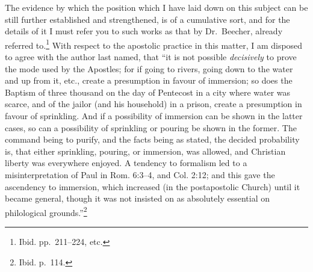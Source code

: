 \documentclass[
  english,
]{book}
\begin{document}
The evidence by which the position which I have laid down on this subject can be still further established and strengthened, is of a cumulative sort, and for the details of it I must refer you to such works as that by Dr.~Beecher, already referred to.\footnote{Ibid. pp.~211--224, etc.} With respect to the apostolic practice in this matter, I am disposed to agree with the author last named, that ``it is not possible \emph{decisively} to prove the mode used by the Apostles; for if going to rivers, going down to the water and up from it, etc., create a presumption in favour of immersion; so does the Baptism of three thousand on the day of Pentecost in a city where water was scarce, and of the jailor (and his household) in a prison, create a presumption in favour of sprinkling. And if a possibility of immersion can be shown in the latter cases, so can a possibility of sprinkling or pouring be shown in the former. The command being to purify, and the facts being as stated, the decided probability is, that either sprinkling, pouring, or immersion, was allowed, and Christian liberty was everywhere enjoyed. A tendency to formalism led to a misinterpretation of Paul in Rom. 6:3--4, and Col. 2:12; and this gave the ascendency to immersion, which increased (in the postapostolic Church) until it became general, though it was not insisted on as absolutely essential on philological grounds.''\footnote{Ibid. p.~114.}
\end{document}

